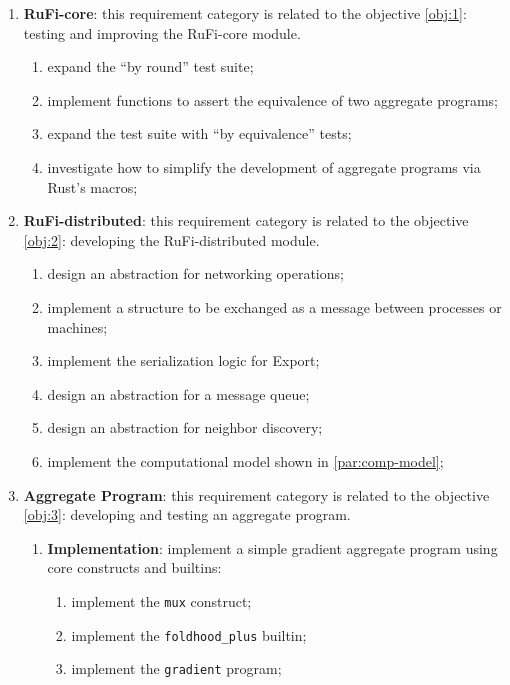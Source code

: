 \begin{enumerate}
    \item \textbf{RuFi-core}: this requirement category is related to the objective \ref{obj:1}: testing and improving the RuFi-core module.
          \begin{enumerate}
              \item expand the ``by round'' test suite;
              \item implement functions to assert the equivalence of two aggregate programs;
              \item expand the test suite with ``by equivalence'' tests;
              \item investigate how to simplify the development of aggregate programs via Rust's macros;
          \end{enumerate}
    \item \textbf{RuFi-distributed}: this requirement category is related to the objective \ref{obj:2}: developing the RuFi-distributed module.
          \begin{enumerate}
              \item design an abstraction for networking operations;
              \item implement a structure to be exchanged as a message between processes or machines;
              \item implement the serialization logic for Export;
              \item design an abstraction for a message queue;
              \item design an abstraction for neighbor discovery;
              \item implement the computational model shown in \ref{par:comp-model};
          \end{enumerate}
    \item \textbf{Aggregate Program}: this requirement category is related to the objective \ref{obj:3}: developing and testing an aggregate program.
          \begin{enumerate}
              \item \textbf{Implementation}: implement a simple gradient aggregate program using core constructs and builtins:
                    \begin{enumerate}
                        \item implement the \texttt{mux} construct;
                        \item implement the \texttt{foldhood\_plus} builtin;
                        \item implement the \texttt{gradient} program;

\end{enumerate}
\end{enumerate}
\end{enumerate}
